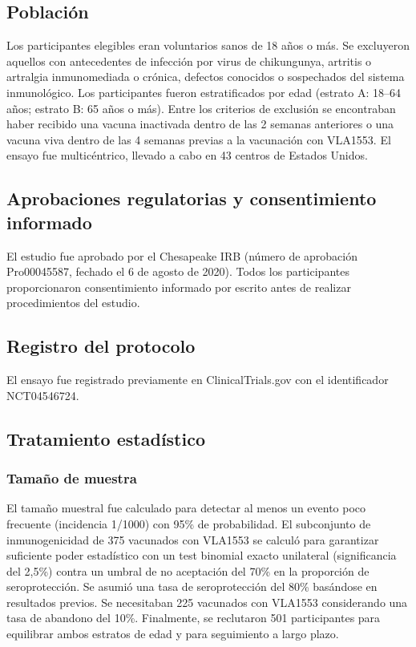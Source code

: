 \documentclass[
]{article}
\begin{document}
\subsection{Población}\label{poblaciuxf3n}

Los participantes elegibles eran voluntarios sanos de 18 años o más. Se
excluyeron aquellos con antecedentes de infección por virus de
chikungunya, artritis o artralgia inmunomediada o crónica, defectos
conocidos o sospechados del sistema inmunológico. Los participantes
fueron estratificados por edad (estrato A: 18--64 años; estrato B: 65
años o más). Entre los criterios de exclusión se encontraban haber
recibido una vacuna inactivada dentro de las 2 semanas anteriores o una
vacuna viva dentro de las 4 semanas previas a la vacunación con VLA1553.
El ensayo fue multicéntrico, llevado a cabo en 43 centros de Estados
Unidos.

\subsection{Aprobaciones regulatorias y consentimiento
informado}\label{aprobaciones-regulatorias-y-consentimiento-informado}

El estudio fue aprobado por el Chesapeake IRB (número de aprobación
Pro00045587, fechado el 6 de agosto de 2020). Todos los participantes
proporcionaron consentimiento informado por escrito antes de realizar
procedimientos del estudio.

\subsection{Registro del protocolo}\label{registro-del-protocolo}

El ensayo fue registrado previamente en ClinicalTrials.gov con el
identificador NCT04546724.

\subsection{Tratamiento estadístico}\label{tratamiento-estaduxedstico}

\subsubsection{Tamaño de muestra}\label{tamauxf1o-de-muestra}

El tamaño muestral fue calculado para detectar al menos un evento poco
frecuente (incidencia 1/1000) con 95\% de probabilidad. El subconjunto
de inmunogenicidad de 375 vacunados con VLA1553 se calculó para
garantizar suficiente poder estadístico con un test binomial exacto
unilateral (significancia del 2,5\%) contra un umbral de no aceptación
del 70\% en la proporción de seroprotección. Se asumió una tasa de
seroprotección del 80\% basándose en resultados previos. Se necesitaban
225 vacunados con VLA1553 considerando una tasa de abandono del 10\%.
Finalmente, se reclutaron 501 participantes para equilibrar ambos
estratos de edad y para seguimiento a largo plazo.
\end{document}
